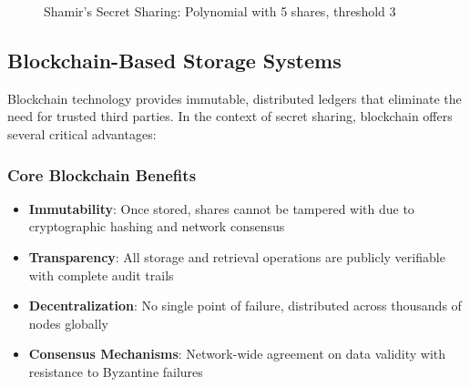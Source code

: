 \documentclass[12pt,a4paper]{article}
\begin{document}
\begin{figure}[H]
\centering
{}
\caption{Shamir's Secret Sharing: Polynomial with 5 shares, threshold 3}
\label{fig:polynomial}
\end{figure}
\subsection{Blockchain-Based Storage Systems}

Blockchain technology provides immutable, distributed ledgers that eliminate the need for trusted third parties. In the context of secret sharing, blockchain offers several critical advantages:

\subsubsection{Core Blockchain Benefits}

\begin{itemize}[leftmargin=15pt]
    \item \textbf{Immutability}: Once stored, shares cannot be tampered with due to cryptographic hashing and network consensus
    \item \textbf{Transparency}: All storage and retrieval operations are publicly verifiable with complete audit trails
    \item \textbf{Decentralization}: No single point of failure, distributed across thousands of nodes globally
    \item \textbf{Consensus Mechanisms}: Network-wide agreement on data validity with resistance to Byzantine failures
\end{itemize}
\end{document}
